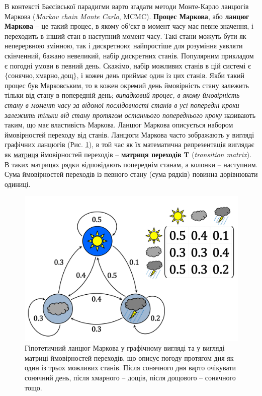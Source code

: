 \documentclass[
  11pt,
]{book}
\begin{document}
В контексті Баєсівської парадигми варто згадати методи Монте-Карло ланцюгів Маркова (\emph{Markov chain Monte Carlo}, MCMC). \textbf{Процес Маркова}, або \textbf{ланцюг Маркова} -- це такий процес, в якому об'єкт в момент часу має певне значення, і переходить в інший стан в наступний момент часу. Такі стани можуть бути як неперервною змінною, так і дискретною; найпростіше для розуміння уявляти скінченний, бажано невеликий, набір дискретних станів. Популярним прикладом є погодні умови в певний день. Скажімо, набір можливих станів в цій системі є \(\{\text{сонячно}, \text{хмарно}, \text{дощ}\}\), і кожен день приймає один із цих станів. Якби такий процес був Марковським, то в кожен окремий день ймовірність стану залежить тільки від стану в попередній день; \emph{випадковий процес, в якому ймовірність стану в момент часу за відомої послідовності станів в усі попередні кроки залежить тільки від стану протягом останнього попереднього кроку} називають таким, що має властивість Маркова. Ланцюг Маркова описується набором ймовірностей переходу від станів. Ланцюги Маркова часто зображають у вигляді графічних ланцюгів (Рис. \ref{fig:fig-3-13}), в той час як їх математична репрезентація виглядає як \hyperref[matrices]{матриця} ймовірностей переходів -- \textbf{матриця переходів} \(\mathbf{T}\) (\emph{transition matrix}). В таких матрицях рядки відповідають попереднім станам, а колонки -- наступним. Сума ймовірностей переходів із певного стану (сума рядків) повинна дорівнювати одиниці.

\begin{figure}
\centering
\includegraphics{images/mc.png}
\caption{\label{fig:fig-3-13}Гіпотетичний ланцюг Маркова у графічному вигляді та у вигляді матриці ймовірностей переходів, що описує погоду протягом дня як один із трьох можливих станів. Після сонячного дня варто очікувати сонячний день, після хмарного -- дощів, після дощового -- сонячного тощо.}
\end{figure}
\end{document}
